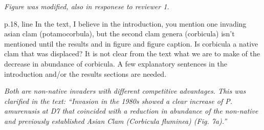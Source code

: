 \documentclass[letterpaper,12pt]{article}
\begin{document}
{\it Figure was modified, also in responese to reviewer 1.}

p.18, line  In the text, I believe in the introduction, you mention one invading asian clam (potamocorbula), but the second clam genera (corbicula) isn't mentioned until the results and in figure and figure caption.  Is corbicula a native clam that was displaced?  It is not clear from the text what we are to make of the decrease in abundance of corbicula.  A few explanatory sentences in the introduction and/or the results sections are needed.

{\it Both are non-native invaders with different competitive advantages.  This was clarified in the text: ``Invasion in the 1980s showed a clear increase of \textit{P. amurenusis} at D7 that coincided with a reduction in abundance of the non-native and previously established Asian Clam (\textit{Corbicula fluminea}) (Fig. 7a).''}
\end{document}
